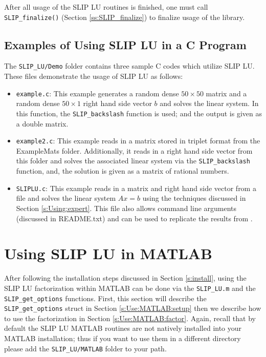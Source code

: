 \documentclass[12pt]{article}
\theoremstyle{definition}
\begin{document}
After all usage of the SLIP LU routines is finished, one must call
\verb|SLIP_finalize()| (Section \ref{ss:SLIP_finalize}) to finalize usage of
the library.

\cprotect\subsection{Examples of Using SLIP LU in a C Program}
\label{s:Using:Examples}

The \verb|SLIP_LU/Demo| folder contains three sample C codes which utilize SLIP
LU. These files demonstrate the usage of SLIP LU as follows:

\begin{itemize}
\item \verb|example.c|: This example generates a random dense $50 \times 50$
matrix and a random dense $50 \times 1$ right hand side vector $b$ and
solves the linear system. In this function, the \verb|SLIP_backslash|
function is used; and the output is given as a double matrix.

\item \verb|example2.c|: This example reads in a matrix stored in triplet
format from the ExampleMats folder. Additionally, it reads in a
right hand side vector from this folder and solves the associated linear system
via the \verb|SLIP_backslash| function, and, the solution is given as a matrix
of rational numbers.

\item \verb|SLIPLU.c|: This example reads in a matrix and right hand side
vector from a file and solves the linear system $A x = b$
using the techniques discussed in Section \ref{s:Using:expert}. This file also
allows command line arguments (discussed in README.txt) and can be used to
replicate the results from \cite{lourenco2019exact}.

\end{itemize}

\cprotect\section{Using SLIP LU in MATLAB}
\label{s:Use:MATLAB}

After following the installation steps discussed in Section \ref{s:install},
using the SLIP LU factorization within MATLAB can be done via the
\verb|SLIP_LU.m| and the \verb|SLIP_get_options| functions. First, this section
will describe the \verb|SLIP_get_options| struct in Section
\ref{s:Use:MATLAB:setup} then we describe how to use the factorization in
Section \ref{s:Use:MATLAB:factor}. Again, recall that by default the SLIP LU
MATLAB routines are not natively installed into your MATLAB installation; thus
if you want to use them in a different directory please add the
\verb|SLIP_LU/MATLAB| folder to your path.
\end{document}
